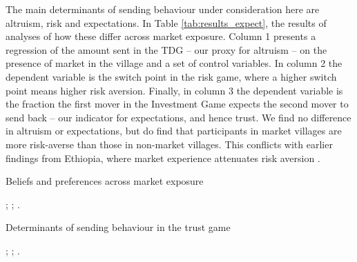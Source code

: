 The main determinants of sending behaviour under consideration here are altruism, risk and expectations. In Table \ref{tab:results_expect}, the results of analyses of how these differ across market exposure. Column 1 presents a regression of the amount sent in the TDG -- our proxy for altruism -- on the presence of market in the village and a set of control variables. In column 2 the dependent variable is the switch point in the risk game, where a higher switch point means higher risk aversion. Finally, in column 3 the dependent variable is the fraction the first mover in the Investment Game expects the second mover to send back -- our indicator for expectations, and hence trust.  We find no difference in altruism or expectations, but do find that participants in market villages are more risk-averse than those in non-market villages. This conflicts with earlier findings from Ethiopia, where market experience attenuates risk aversion \citep{Melesse2015}.

\newcommand{\notes}{
		\footnotesize
		\item $t$ statistics in parentheses; $* p < 0.10, ** p < 0.05, *** p < 0.01$; Controls include: Village size, household size, religion, number of wives, and leadership position in the village
		\item
}

\begin{threeparttable}[htb]
	\small
	\caption{Beliefs and preferences across market exposure}
	\label{tab:results_expect}
	\centering
	
	\begin{tablenotes}
		\footnotesize
		\item \camsig; \camcluster; \camcontrols.
		\item
	\end{tablenotes}
\end{threeparttable}


\begin{threeparttable}[htb]
	\centering
	\small

	\caption{Determinants of sending behaviour in the trust game}
	\label{tab:results_basic}
	
	
	\begin{tablenotes}
		\footnotesize
		\item \camsig; \camcluster; \camcontrols.
		\item
	\end{tablenotes}
\end{threeparttable}


